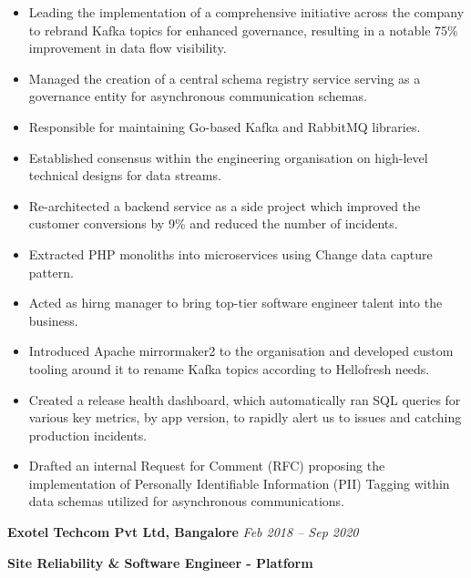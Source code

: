 \documentclass[11pt, oneside]{article}
\begin{document}
\begin{itemize}
  \item Leading the implementation of a comprehensive initiative across the company to rebrand Kafka topics for enhanced governance, resulting in a notable 75\% improvement in data flow visibility.
  \item Managed the creation of a central schema registry service serving as a governance entity for asynchronous communication schemas. 
  \item Responsible for maintaining Go-based Kafka and RabbitMQ libraries. 
  \item Established consensus within the engineering organisation on high-level technical designs for data streams.
  \item Re-architected a backend service as a side project which improved the customer conversions by 9\% and reduced the number of incidents.
  \item Extracted PHP monoliths into microservices using Change data capture pattern.
  \item Acted as hirng manager to bring top-tier software engineer talent into the business. 
  \item Introduced Apache mirrormaker2 to the organisation and developed custom tooling around it to rename Kafka topics according to Hellofresh needs.
  \item Created a release health dashboard, which automatically ran SQL queries for various key metrics, by app version, to rapidly alert us to issues and catching production incidents. 
  \item Drafted an internal Request for Comment (RFC) proposing the implementation of Personally Identifiable Information (PII) Tagging within data schemas utilized for asynchronous communications.

\end{itemize}

\medskip

\textbf{Exotel Techcom Pvt Ltd, Bangalore}
\hfill
\textit{Feb 2018 – Sep 2020}

\textbf{Site Reliability \& Software Engineer - Platform}
\end{document}
